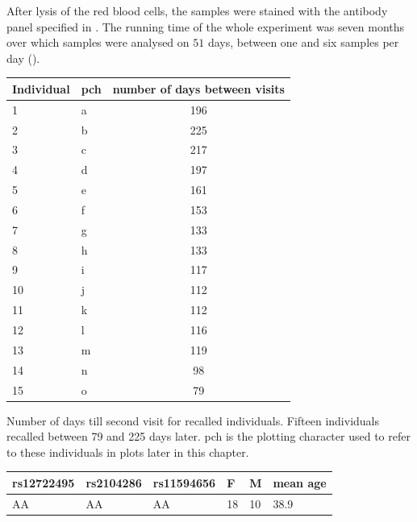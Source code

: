 After lysis of the red blood cells, the samples were stained with the antibody panel specified in .  
The running time of the whole experiment was seven months over which samples were analysed on $51$ days,
between one and six samples per day ().  

\begin{table}
\centering
\begin{tabular}{llc}
  \hline
  Individual      &  pch           & number of days between visits \\
  \hline
  1      &  a       & 196 \\
  2      &  b       & 225 \\
  3      &  c       & 217 \\
  4      &  d       & 197 \\
  5      &  e       & 161 \\
  6      &  f       & 153 \\
  7      &  g       & 133 \\
  8      &  h       & 133 \\
  9      &  i       & 117 \\
  10     &  j       & 112 \\
  11     &  k       & 112 \\
  12     &  l       & 116 \\
  13     &  m       & 119 \\
  14     &  n       & 98 \\
  15     &  o       & 79  \\
  \hline
\end{tabular}
{Number of days till second visit for recalled individuals.}
{
Fifteen individuals recalled between 79 and 225 days later.
pch is the plotting character used to refer to these individuals in plots later in this chapter.
}
\vspace{1em}
\begin{tabular}{llllll}
\hline
rs12722495 & rs2104286 & rs11594656 & F & M & mean age\\
\hline
AA & AA & AA & 18 & 10 & 38.9\\

\end{tabular}
\end{table}

